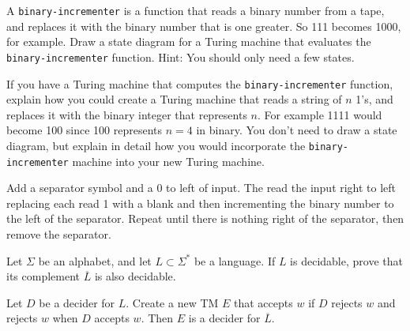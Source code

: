 \documentclass[12pt,answers]{exam}
\begin{document}
\begin{questions}

\question A \verb|binary-incrementer| is a function that reads a binary number from a tape, and replaces it with the binary number that is one greater.  So 111 becomes 1000, for example.  Draw a state diagram for a Turing machine that evaluates the \verb|binary-incrementer| function. Hint: You should only need a few states.  
\begin{solution}
\begin{center}
\end{center}
\end{solution}
\vfill

\newpage
\question If you have a Turing machine that computes the \verb|binary-incrementer| function, explain how you could create a Turing machine that reads a string of $n$ 1's, and replaces it with the binary integer that represents $n$. For example 1111 would become 100 since 100 represents $n=4$ in binary. %
You don't need to draw a state diagram, but explain in detail how you would incorporate the \verb|binary-incrementer| machine into your new Turing machine.
\begin{solution}
Add a separator symbol and a 0 to left of input.  The read the input right to left replacing each read 1 with a blank and then incrementing the binary number to the left of the separator.  Repeat until there is nothing right of the separator, then remove the separator.  
\end{solution}

\vfill

\question Let $\Sigma$ be an alphabet, and let $L \subset \Sigma^*$ be a language.  If $L$ is decidable, prove that its complement $\overline{L}$ is also decidable. 
\begin{solution}
Let $D$ be a decider for $L$.  Create a new TM $E$ that accepts $w$ if $D$ rejects $w$ and rejects $w$ when $D$ accepts $w$. Then $E$ is a decider for $\overline{L}$. 
\end{solution}


\end{questions}
\end{document}
